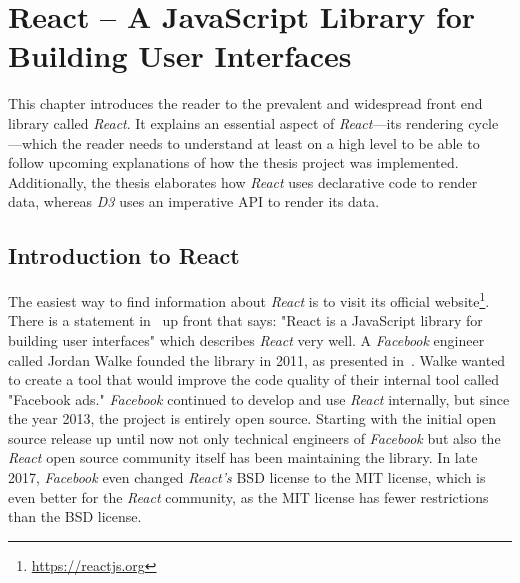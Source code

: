 \chapter{React -- A JavaScript Library for Building User Interfaces}
\label{cha:react}

This chapter introduces the reader to the prevalent and widespread front end library called \emph{React}. It explains an essential aspect of \emph{React}---its rendering cycle---which the reader needs to understand at least on a high level to be able to follow upcoming explanations of how the thesis project was implemented. Additionally, the thesis elaborates how \emph{React} uses declarative code to render data, whereas \emph{D3} uses an imperative API to render its data.

\section{Introduction to React}
\label{sec:reactIntro}

The easiest way to find information about \emph{React} is to visit its official website\footnote{\url{https://reactjs.org}}. There is a statement in~\cite{React} up front that says: "React is a JavaScript library for building user interfaces" which describes \emph{React} very well. A \emph{Facebook} engineer called Jordan Walke founded the library in 2011, as presented in~\cite[05:30]{ReactFoundingVideo}. Walke wanted to create a tool that would improve the code quality of their internal tool called "Facebook ads." \emph{Facebook} continued to develop and use \emph{React} internally, but since the year 2013, the project is entirely open source. Starting with the initial open source release up until now not only technical engineers of \emph{Facebook} but also the \emph{React} open source community itself has been maintaining the library. In late 2017, \emph{Facebook} even changed \emph{React's} BSD license to the MIT license, which is even better for the \emph{React} community, as the MIT license has fewer restrictions than the BSD license.


